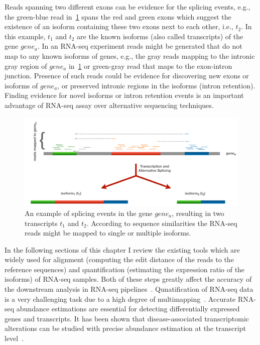 Reads spanning two different exons can be evidence for the splicing events, 
e.g., the green-blue read in~\cref{fig:altsplice} spans the red and green 
exons which suggest the existence of an isoform containing these two exons 
next to each other, i.e., $t_2$. In this example, $t_1$ and $t_2$ are the 
known isoforms (also called transcripts) of the gene $gene_a$. In an RNA-seq 
experiment reads might be generated that do not map to any known isoforms of 
genes, e.g., the gray reads mapping to the intronic gray region of $gene_a$ 
in~\cref{fig:altsplice} or green-gray read that maps to the exon-intron 
junction. Presence of such reads could be evidence for discovering new exons 
or isoforms of $gene_a$, or preserved intronic regions in the isoforms (intron 
retention). Finding evidence for novel isoforms or intron retention events is 
an important advantage of RNA-seq assay over alternative sequencing techniques.

\begin{figure}
 \centering
 \includegraphics[width=0.95\columnwidth]{Figures/intro/alt-splice.pdf}
 \caption[Alternative splicing of genes]{An example of splicing events in 
 the gene $gene_a$, resulting in two transcripts $t_1$ and $t_2$. According 
 to sequence similarities the RNA-seq reads might be mapped to single or 
 multiple isoforms.}
  \label{fig:altsplice}
\end{figure}

In the following sections of this chapter I review the existing tools which 
are widely used for alignment (computing the edit distance of the reads to 
the reference sequences) and quantification (estimating the expression ratio 
of the isoforms) of RNA-seq samples. Both of these steps greatly affect the 
accuracy of the downstream analysis in RNA-seq pipelines~\citep{srivastava2019alignment}. 
Qunatification of RNA-seq data is a very challenging task due to a high degree of
multimapping~\citep{van2019rna}. Accurate RNA-seq abundance estimations are essential for detecting
differentially expressed genes and transcripts. It has been shown that 
disease-associated transcriptomic alterations can be studied with precise abundance estimation
at the transcript level~\citep{dick2020differential}.

